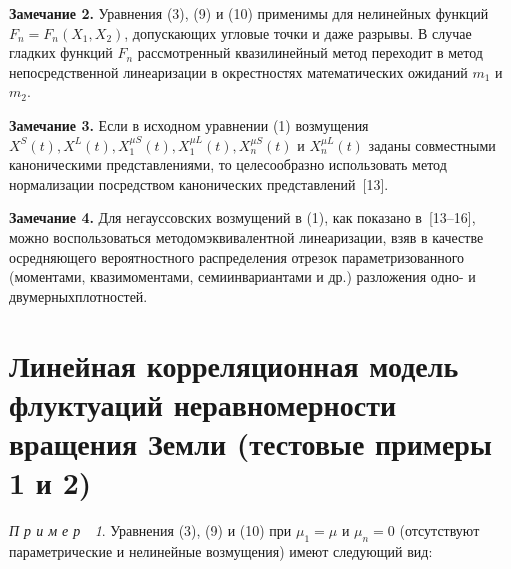 \begin{multicols}{2}
{\medskip
\textbf{ Замечание 2.} Уравнения (3), (9) и (10) применимы для
нелинейных функций $F_n = F_n (X_1, X_2)$, допускающих угловые
точки и даже разрывы. В случае гладких функций $F_n$ рассмотренный
квазилинейный метод переходит в метод непосредственной линеаризации
в окрестностях математических ожиданий $m_1$ и $m_2$.

\medskip
\textbf{ Замечание 3.} Если в исходном уравнении (1) возмущения
$X^S(t), X^L (t), X_1^{\mu S} (t), X_1^{\mu L}(t),  X_n^{\mu S}(t)$ и
$ X_n^{\mu L}(t)$ заданы совместными каноническими
представлениями, то целесообразно использовать метод нормализации
посредством канонических представлений~[13].

\medskip
\textbf{ Замечание 4.} Для негауссовских возмущений в (1), как
показано в~[13--16], можно воспользоваться методом\linebreak эквивалентной
линеаризации, взяв в качестве осред\-няющего вероятностного
распределения отрезок пара\-мет\-ри\-зо\-ванного (моментами, квазимоментами,
семиинвариантами и др.) разложения одно- и двумерных\linebreak плотностей.
 }

\section{Линейная корреляционная модель флуктуаций неравномерности
вращения Земли (тестовые примеры 1 и 2)} %


 \textit{П р и м е р~~1\/}. Уравнения (3), (9) и (10) при $\mu_1= \mu$ и $\mu_n =0$
(отсутствуют параметрические и нелинейные возмущения) имеют
следующий вид:


\end{multicols}
